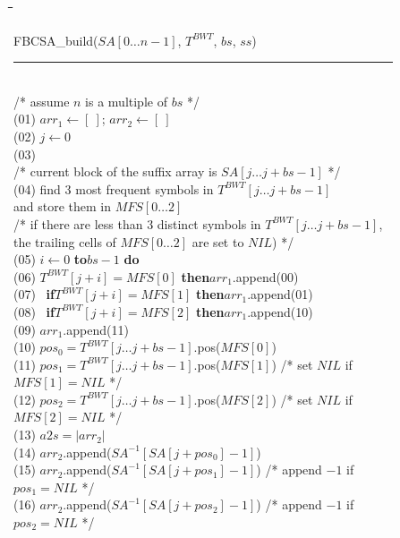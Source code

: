 \documentclass{cai}
\newcommand{\uassign}{\leftarrow}
\newcommand{\uif}{{\bf if}\xspace}
\newcommand{\uthen}{{\bf then}\xspace}
\newcommand{\uelse}{{\bf else}\xspace}
\newcommand{\urepeat}{{\bf repeat}\xspace}
\newcommand{\ufor}{{\bf for}\xspace}
\newcommand{\uto}{{\bf to}\xspace}
\newcommand{\udo}{{\bf do}\xspace}
\newcounter{lineno}
\newcommand{\utab}{\qquad}
\newcommand{\startindent}{\hspace{0.8em}}
\newenvironment{code}{\setcounter{lineno}{0}\begin{tabbing}
\utab\=\utab\=\utab\=\utab\=\utab\=\utab\=\utab\=\utab\=\utab\=\utab\=\utab\=\utab\=\utab\= \kill
}
{
\end{tabbing}\vspace{-2mm}
}
\begin{document}
\begin{figure}
\begin{small}
\begin{code}
FBCSA\_build($SA[0 \ldots n-1]$, $T^{BWT}$, $bs$, $ss$) \\
\rule{\textwidth}{0.3mm} \\
/* assume $n$ is a multiple of $bs$ */ \\
(01) \startindent $arr_1 \uassign [\ ]$; $arr_2 \uassign [\ ]$ \\
(02) \startindent $j \uassign 0$ \\
(03) \startindent \urepeat \\
\>\>/* current block of the suffix array is $SA[j \ldots j+bs-1]$ */ \\
(04) \startindent \>\>find 3 most frequent symbols in $T^{BWT}[j \ldots j+bs-1]$ \\
\>\>\> and store them in $MFS[0 \ldots 2]$ \\ 
\>\>\> /* if there are less than 3 distinct symbols in $T^{BWT}[j \ldots j+bs-1]$, \\ 
\>\>\>\> the trailing cells of $MFS[0 \ldots 2]$ are set to $NIL$) */ \\
(05) \startindent \>\>\ufor $i \uassign 0$ \uto $bs-1$ \udo \\
(06) \startindent \>\>\>\uif $T^{BWT}[j+i] = MFS[0]$ \uthen $arr_1$.append(00) \\
(07) \startindent \>\>\>\uelse \ \uif $T^{BWT}[j+i] = MFS[1]$ \uthen $arr_1$.append(01) \\
(08) \startindent \>\>\>\>\uelse \ \uif $T^{BWT}[j+i] = MFS[2]$ \uthen $arr_1$.append(10) \\
(09) \startindent \>\>\>\>\>\uelse $arr_1$.append(11) \\
(10) \startindent \>\>$pos_0 = T^{BWT}[j \ldots j+bs-1]$.pos($MFS[0]$) \\
(11) \startindent \>\>$pos_1 = T^{BWT}[j \ldots j+bs-1]$.pos($MFS[1]$) /* set $NIL$ if $MFS[1] = NIL$ */ \\
(12) \startindent \>\>$pos_2 = T^{BWT}[j \ldots j+bs-1]$.pos($MFS[2]$) /* set $NIL$ if $MFS[2] = NIL$ */ \\
(13) \startindent \>\>$a2s = |arr_2|$ \\
(14) \startindent \>\>$arr_2$.append($SA^{-1}[SA[j + pos_0] - 1]$) \\
(15) \startindent \>\>$arr_2$.append($SA^{-1}[SA[j + pos_1] - 1]$) /* append $-1$ if $pos_1 = NIL$ */ \\
(16) \startindent \>\>$arr_2$.append($SA^{-1}[SA[j + pos_2] - 1]$) /* append $-1$ if $pos_2 = NIL$ */ \\

\end{code}
\end{small}
\end{figure}
\end{document}
